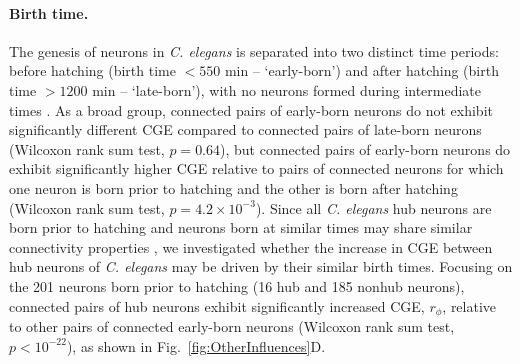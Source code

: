 \documentclass[10pt,letterpaper]{article}
\begin{document}
{\paragraph{Birth time.}
The genesis of neurons in \emph{C. elegans} is separated into two distinct time periods: before hatching (birth time $<550$ min -- `early-born') and after hatching (birth time $>1200$ min -- `late-born'), with no neurons formed during intermediate times \cite{Varier2011}.
As a broad group, connected pairs of early-born neurons do not exhibit significantly different CGE compared to connected pairs of late-born neurons (Wilcoxon rank sum test, $p = 0.64$), but connected pairs of early-born neurons do exhibit significantly higher CGE relative to pairs of connected neurons for which one neuron is born prior to hatching and the other is born after hatching (Wilcoxon rank sum test, $p = 4.2 \times 10^{-3}$).
Since all \emph{C. elegans} hub neurons are born prior to hatching \cite{Towlson2013} and neurons born at similar times may share similar connectivity properties \cite{Schroter:2017eo}, we investigated whether the increase in CGE between hub neurons of \emph{C. elegans} may be driven by their similar birth times.
Focusing on the 201 neurons born prior to hatching (16 hub and 185 nonhub neurons), connected pairs of hub neurons exhibit significantly increased CGE, $r_\phi$, relative to other pairs of connected early-born neurons (Wilcoxon rank sum test, $p < 10^{-22}$), as shown in Fig.~\ref{fig:OtherInfluences}D.


}
\end{document}
